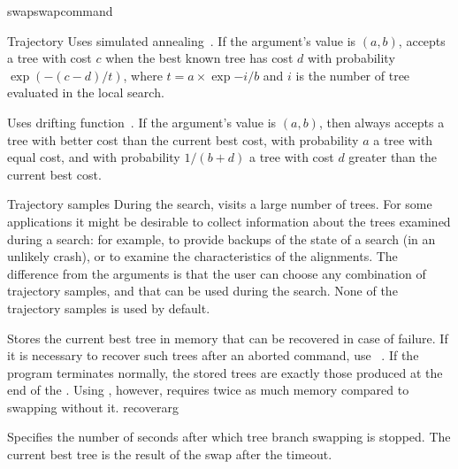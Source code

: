 \begin{command}{swap}{swapcommand}
\begin{arguments}
\begin{argumentgroup}{Trajectory}
                {Uses simulated annealing~\cite{Kirkpatrick1983}. If the argument's value is $(a, b)$, 
                \poy accepts a tree with cost $c$ when the best known tree has
                cost $d$ with probability $\exp{(- (c - d) / t)}$, where
                $t = a \times \exp{- i / b}$ and $i$ is the number of tree
                evaluated in the local search.}
                {}

                {Uses \poy drifting function~\cite{goloboff1999}. If the argument's value is
                $(a, b)$, then \poy always accepts a tree with better cost than
                the current best cost, with probability $a$ a tree with equal cost,
                and with probability $1 / (b + d)$ a tree with cost $d$ greater
                than the current best cost.}
                {}

        \end{argumentgroup}

        \begin{argumentgroup}{Trajectory samples}
            {During the search, \poy visits a large number of trees. For some
            applications it might be desirable to  collect information about the
            trees examined during a search: for example, to provide backups of
            the state of a search (in an unlikely crash), or to examine the
            characteristics of the alignments.  The difference from the
             arguments is that the user can choose any
            combination of trajectory samples, and that can be used during the
            search. None of the trajectory samples is used by default.}

                {Stores the current best tree in memory that can be recovered in
                case of failure. If it is necessary to recover such trees after
                an aborted command, use ~.  If the program
                terminates normally, the stored trees are exactly those produced
                at the end of the . Using
                , however, requires twice as much memory
                compared to swapping without it.}
                {recoverarg}

                {Specifies the number of seconds after which tree branch
                swapping is stopped. The current best tree is the result of the
                swap after the timeout.} 
                {}


\end{argumentgroup}
\end{arguments}
\end{command}
